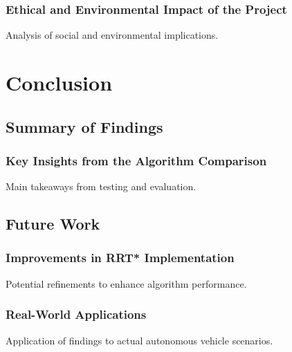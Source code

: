\documentclass[a4paper,11pt]{report}
\begin{document}
\subsection{Ethical and Environmental Impact of the Project}
Analysis of social and environmental implications.

\newpage

\chapter{Conclusion}
\section{Summary of Findings}
\subsection{Key Insights from the Algorithm Comparison}
Main takeaways from testing and evaluation.

\section{Future Work}
\subsection{Improvements in RRT* Implementation}
Potential refinements to enhance algorithm performance.

\subsection{Real-World Applications}
Application of findings to actual autonomous vehicle scenarios.

\newpage
\end{document}
